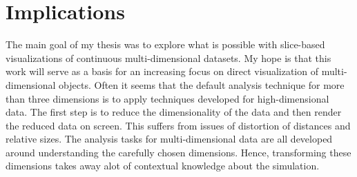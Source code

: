 
\section{Implications}

The main goal of my thesis was to explore what is possible with slice-based
visualizations of continuous multi-dimensional datasets. My hope is that this
work will serve as a basis for an increasing focus on direct visualization of
multi-dimensional objects. Often it seems that the default analysis technique
for more than three dimensions is to apply techniques developed for
high-dimensional data. The first step is to reduce the dimensionality of the
data and then render the reduced data on screen. This suffers from issues of
distortion of distances and relative sizes. The analysis tasks for
multi-dimensional data are all developed around understanding the carefully
chosen dimensions. Hence, transforming these dimensions takes away alot of
contextual knowledge about the simulation. 





